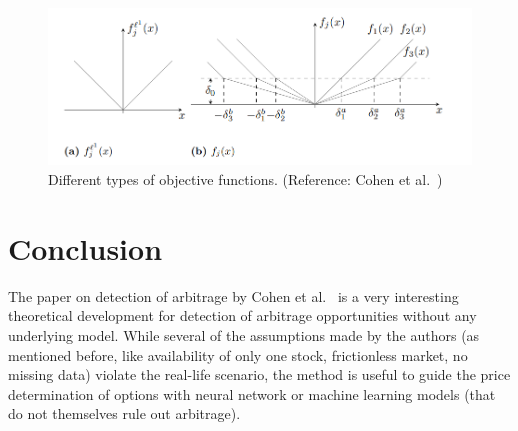 \documentclass[12pt]{article}
\begin{document}
\begin{figure}[h]
    \centering
    \includegraphics[width = 0.8\linewidth]{bidask.png}
    \caption{Different types of objective functions. (Reference: Cohen et al.~\cite{cohen2020detecting})}
    \label{fig:bidask}
\end{figure}

\section{Conclusion}

The paper on detection of arbitrage by Cohen et al.~\cite{cohen2020detecting} is a very interesting theoretical development for detection of arbitrage opportunities without any underlying model. While several of the assumptions made by the authors (as mentioned before, like availability of only one stock, frictionless market, no missing data) violate the real-life scenario, the method is useful to guide the price determination of options with neural network or machine learning models (that do not themselves rule out arbitrage). 


\printbibliography
\end{document}
